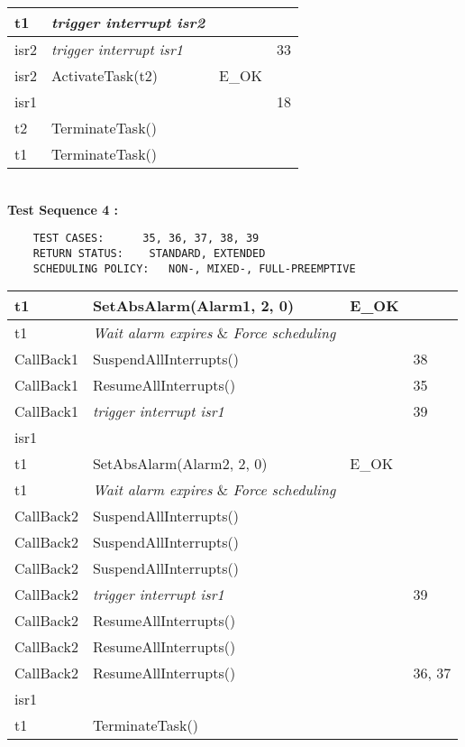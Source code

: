\documentclass[10pt]{article}
\newlength{\Li}\settowidth{\Li}{Running}
\newlength{\Lii}\setlength{\Lii}{7cm}
\newlength{\Liiii}\setlength{\Liiii}{0.9cm}
\newlength{\Liii}\setlength{\Liii}{\textwidth} \addtolength{\Liii}{-\Li} \addtolength{\Liii}{-\Lii} \addtolength{\Liii}{-\Liiii}
\begin{document}
	\begin{supertabular}{|p{\Li}|p{\Lii}|p{\Liii}|p{\Liiii}|} \hline 
	t1 	& \textit{trigger interrupt isr2}		& 		 	&  \\ \hline
	isr2	& \textit{trigger interrupt isr1}		& 			& 33 \\ \hline
	isr2	& ActivateTask(t2)				& E\_OK		&  \\ \hline
	isr1	&							&			& 18 \\ \hline
	t2 	& TerminateTask()				& 		 	&  \\ \hline
	t1 	& TerminateTask()				& 		 	&  \\ \hline 
	\end{supertabular} \\
	
	\textbf{Test Sequence 4 :}
	\begin{lstlisting}
	TEST CASES:		 35, 36, 37, 38, 39
	RETURN STATUS:	  STANDARD, EXTENDED
	SCHEDULING POLICY:   NON-, MIXED-, FULL-PREEMPTIVE
	\end{lstlisting}
	
	
	\begin{supertabular}{|p{\Li}|p{\Lii}|p{\Liii}|p{\Liiii}|} \hline 
	t1	& SetAbsAlarm(Alarm1, 2, 0)						& E\_OK 		& \\ \hline
	t1	& \textit{Wait alarm expires} \& \textit{Force scheduling} 	& 			& \\ \hline 
	CallBack1 & SuspendAllInterrupts()						& 			& 38 \\ \hline
	CallBack1 & ResumeAllInterrupts()						& 			& 35 \\ \hline
	CallBack1 & \textit{trigger interrupt isr1}					& 			& 39 \\ \hline
	isr1		& 										& 			&  \\ \hline
	t1	& SetAbsAlarm(Alarm2, 2, 0)						& E\_OK 		& \\ \hline
	t1	& \textit{Wait alarm expires} \& \textit{Force scheduling} 	& 			& \\ \hline 
	CallBack2 & SuspendAllInterrupts()						& 			& \\ \hline
	CallBack2 & SuspendAllInterrupts()						& 			& \\ \hline
	CallBack2 & SuspendAllInterrupts()						& 			& \\ \hline
	CallBack2 & \textit{trigger interrupt isr1}					& 			& 39 \\ \hline
	CallBack2 & ResumeAllInterrupts()						& 			&  \\ \hline
	CallBack2 & ResumeAllInterrupts()						& 			&  \\ \hline
	CallBack2 & ResumeAllInterrupts()						& 			& 36, 37 \\ \hline
	isr1		& 										& 			&  \\ \hline
	t1	& TerminateTask()								& 			& \\ \hline
	\end{supertabular} \\
	
\end{document}
